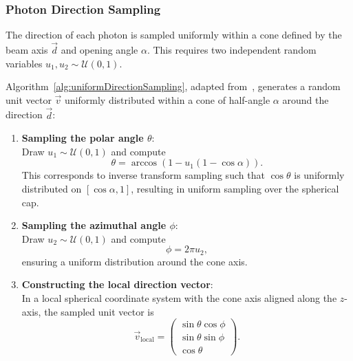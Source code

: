 \subsubsection{Photon Direction Sampling}

The direction of each photon is sampled uniformly within a cone defined by the
beam axis $\vec{d}$ and opening angle $\alpha$. This requires two independent
random variables $u_1, u_2 \sim \mathcal{U}(0, 1)$.

Algorithm~\ref{alg:uniformDirectionSampling}, adapted
from~\cite{venkatapathi2021n}, generates a random unit vector $\vec{v}$
uniformly distributed within a cone of half-angle $\alpha$ around the direction
$\vec{d}$:

\begin{enumerate}
    \item \textbf{Sampling the polar angle $\theta$}:\\
    Draw $u_1 \sim \mathcal{U}(0,1)$ and compute
    \[
        \theta = \arccos\left(1 - u_1 (1 - \cos \alpha)\right).
    \]
    This corresponds to inverse transform sampling such that $\cos\theta$ is
    uniformly distributed on $[\cos\alpha, 1]$, resulting in uniform sampling
    over the spherical cap.

    \item \textbf{Sampling the azimuthal angle $\phi$}:\\
    Draw $u_2 \sim \mathcal{U}(0,1)$ and compute
    \[
        \phi = 2\pi u_2,
    \]
    ensuring a uniform distribution around the cone axis.

    \item \textbf{Constructing the local direction vector}:\\
    In a local spherical coordinate system with the cone axis aligned along the
    $z$-axis, the sampled unit vector is
    \[
        \vec{v}_{\text{local}} =
        \begin{pmatrix}
            \sin\theta \cos\phi \\
            \sin\theta \sin\phi \\
            \cos\theta
        \end{pmatrix}.
    \]


\end{enumerate}
